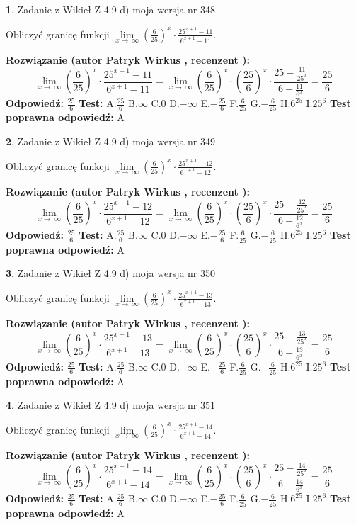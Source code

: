 \documentclass[12pt, a4paper]{article}
\theoremstyle{definition} %
\newtheorem{zad}{}
\newcommand{\zadStart}[1]{\begin{zad}#1\newline}
\newcommand{\zadStop}{\end{zad}}
\newcommand{\rozwStart}[2]{\noindent \textbf{Rozwiązanie (autor #1 , recenzent #2): }\newline}
\newcommand{\rozwStop}{\newline}
\newcommand{\odpStart}{\noindent \textbf{Odpowiedź:}\newline}
\newcommand{\odpStop}{\newline}
\newcommand{\testStart}{\noindent \textbf{Test:}\newline}
\newcommand{\testStop}{\newline}
\newcommand{\kluczStart}{\noindent \textbf{Test poprawna odpowiedź:}\newline}
\newcommand{\kluczStop}{\newline}
\begin{document}
\zadStart{Zadanie z Wikieł Z 4.9 d) moja wersja nr 348}


Obliczyć granicę funkcji  $\lim\limits_{x\to\ \infty}(\frac{6}{25})^{x}\cdot\frac{25^{x+1}-11}{6^{x+1}-11}$.
\zadStop
\rozwStart{Patryk Wirkus}{}
$$\lim\limits_{x\to\ \infty}(\frac{6}{25})^{x}\cdot\frac{25^{x+1}-11}{6^{x+1}-11}=\lim\limits_{x\to\ \infty}(\frac{6}{25})^{x}\cdot(\frac{25}{6})^{x} \cdot \frac{25-\frac{11}{25^{x}}}{6-\frac{11}{6^{x}}} = \frac{25}{6}$$
\rozwStop
\odpStart
$\frac{25}{6}$
\odpStop
\testStart
A.$\frac{25}{6}$ B.$\infty$ C.$0$ D.$-\infty$ E.$-\frac{25}{6}$
F.$\frac{6}{25}$ G.$-\frac{6}{25}$
H.$6^{25}$
I.$25^{6}$
\testStop
\kluczStart
A
\kluczStop



\zadStart{Zadanie z Wikieł Z 4.9 d) moja wersja nr 349}


Obliczyć granicę funkcji  $\lim\limits_{x\to\ \infty}(\frac{6}{25})^{x}\cdot\frac{25^{x+1}-12}{6^{x+1}-12}$.
\zadStop
\rozwStart{Patryk Wirkus}{}
$$\lim\limits_{x\to\ \infty}(\frac{6}{25})^{x}\cdot\frac{25^{x+1}-12}{6^{x+1}-12}=\lim\limits_{x\to\ \infty}(\frac{6}{25})^{x}\cdot(\frac{25}{6})^{x} \cdot \frac{25-\frac{12}{25^{x}}}{6-\frac{12}{6^{x}}} = \frac{25}{6}$$
\rozwStop
\odpStart
$\frac{25}{6}$
\odpStop
\testStart
A.$\frac{25}{6}$ B.$\infty$ C.$0$ D.$-\infty$ E.$-\frac{25}{6}$
F.$\frac{6}{25}$ G.$-\frac{6}{25}$
H.$6^{25}$
I.$25^{6}$
\testStop
\kluczStart
A
\kluczStop



\zadStart{Zadanie z Wikieł Z 4.9 d) moja wersja nr 350}


Obliczyć granicę funkcji  $\lim\limits_{x\to\ \infty}(\frac{6}{25})^{x}\cdot\frac{25^{x+1}-13}{6^{x+1}-13}$.
\zadStop
\rozwStart{Patryk Wirkus}{}
$$\lim\limits_{x\to\ \infty}(\frac{6}{25})^{x}\cdot\frac{25^{x+1}-13}{6^{x+1}-13}=\lim\limits_{x\to\ \infty}(\frac{6}{25})^{x}\cdot(\frac{25}{6})^{x} \cdot \frac{25-\frac{13}{25^{x}}}{6-\frac{13}{6^{x}}} = \frac{25}{6}$$
\rozwStop
\odpStart
$\frac{25}{6}$
\odpStop
\testStart
A.$\frac{25}{6}$ B.$\infty$ C.$0$ D.$-\infty$ E.$-\frac{25}{6}$
F.$\frac{6}{25}$ G.$-\frac{6}{25}$
H.$6^{25}$
I.$25^{6}$
\testStop
\kluczStart
A
\kluczStop



\zadStart{Zadanie z Wikieł Z 4.9 d) moja wersja nr 351}


Obliczyć granicę funkcji  $\lim\limits_{x\to\ \infty}(\frac{6}{25})^{x}\cdot\frac{25^{x+1}-14}{6^{x+1}-14}$.
\zadStop
\rozwStart{Patryk Wirkus}{}
$$\lim\limits_{x\to\ \infty}(\frac{6}{25})^{x}\cdot\frac{25^{x+1}-14}{6^{x+1}-14}=\lim\limits_{x\to\ \infty}(\frac{6}{25})^{x}\cdot(\frac{25}{6})^{x} \cdot \frac{25-\frac{14}{25^{x}}}{6-\frac{14}{6^{x}}} = \frac{25}{6}$$
\rozwStop
\odpStart
$\frac{25}{6}$
\odpStop
\testStart
A.$\frac{25}{6}$ B.$\infty$ C.$0$ D.$-\infty$ E.$-\frac{25}{6}$
F.$\frac{6}{25}$ G.$-\frac{6}{25}$
H.$6^{25}$
I.$25^{6}$
\testStop
\kluczStart
A
\kluczStop
\end{document}

